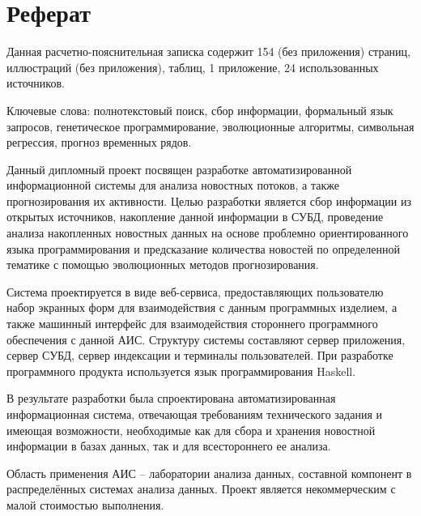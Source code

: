 \section*{Реферат}
Данная расчетно-пояснительная записка содержит 154 (без приложения) страниц,  иллюстраций (без приложения),  таблиц, 1 приложение, 24 использованных источников.

Ключевые слова: полнотекстовый поиск, сбор информации, формальный язык запросов, генетическое программирование, эволюционные алгоритмы, символьная регрессия, прогноз временных рядов.

Данный дипломный проект посвящен разработке автоматизированной информационной системы для анализа новостных потоков, а также прогнозирования их активности. Целью разработки является сбор информации из открытых источников, накопление данной информации в СУБД, проведение анализа накопленных новостных данных на основе проблемно ориентированного языка программирования и предсказание количества новостей по определенной тематике с помощью эволюционных методов прогнозирования.

Система проектируется в виде веб-сервиса, предоставляющих пользователю набор экранных форм для взаимодействия с данным программных изделием, а также машинный интерфейс для взаимодействия стороннего программного обеспечения с данной АИС. Структуру системы составляют сервер приложения, сервер СУБД, сервер индексации и терминалы пользователей. При разработке программного продукта используется язык программирования Haskell.

В результате разработки была спроектирована автоматизированная информационная система, отвечающая требованиям технического задания и имеющая возможности, необходимые как для сбора и хранения новостной информации в базах данных, так и для всестороннего ее анализа.

Область применения АИС -- лаборатории анализа данных, составной компонент в распределённых системах анализа данных. Проект является некоммерческим с малой стоимостью выполнения.
